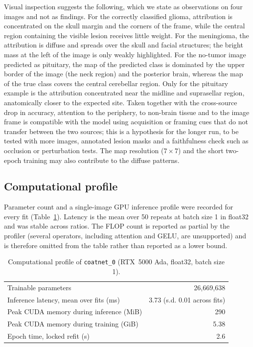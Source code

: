 \documentclass[10pt,a4paper]{article}
\begin{document}
Visual inspection suggests the following, which we state as observations on four images and not as findings. For the correctly classified glioma, attribution is concentrated on the skull margin and the corners of the frame, while the central region containing the visible lesion receives little weight. For the meningioma, the attribution is diffuse and spreads over the skull and facial structures; the bright mass at the left of the image is only weakly highlighted. For the no-tumor image predicted as pituitary, the map of the predicted class is dominated by the upper border of the image (the neck region) and the posterior brain, whereas the map of the true class covers the central cerebellar region. Only for the pituitary example is the attribution concentrated near the midline and suprasellar region, anatomically closer to the expected site. Taken together with the cross-source drop in accuracy, attention to the periphery, to non-brain tissue and to the image frame is compatible with the model using acquisition or framing cues that do not transfer between the two sources; this is a hypothesis for the longer run, to be tested with more images, annotated lesion masks and a faithfulness check such as occlusion or perturbation tests. The map resolution ($7\times7$) and the short two-epoch training may also contribute to the diffuse patterns.

\subsection{Computational profile}
Parameter count and a single-image GPU inference profile were recorded for every fit (Table~\ref{tab:prof}). Latency is the mean over 50 repeats at batch size 1 in float32 and was stable across ratios. The FLOP count is reported as partial by the profiler (several operators, including attention and GELU, are unsupported) and is therefore omitted from the table rather than reported as a lower bound.

\begin{table}[H]\centering\small
\caption{Computational profile of \texttt{coatnet\_0} (RTX~5000 Ada, float32, batch size 1).}\label{tab:prof}
\begin{tabular}{lr}
\toprule
Trainable parameters & 26,669,638 \\
Inference latency, mean over fits (ms) & 3.73 (s.d. 0.01 across fits) \\
Peak CUDA memory during inference (MiB) & 290 \\
Peak CUDA memory during training (GiB) & 5.38 \\
Epoch time, locked refit (s) & 2.6 \\
\bottomrule
\end{tabular}
\end{table}
\end{document}
